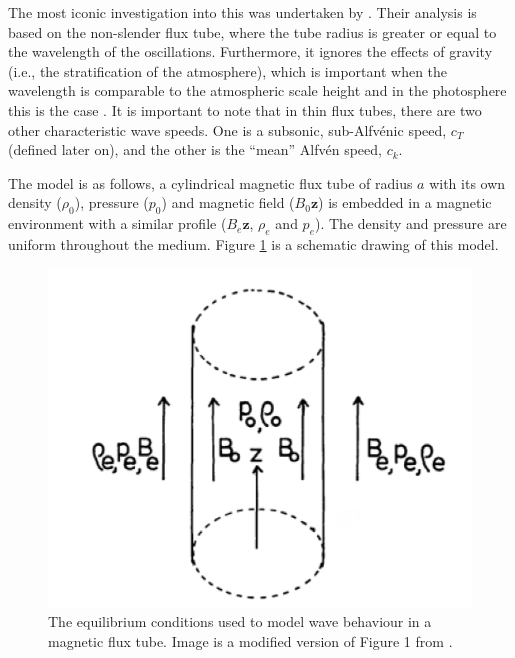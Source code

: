     The most iconic investigation into this was undertaken by \citealt{WPMC}.
    Their analysis is based on the non-slender flux tube, where the tube radius is greater or equal to the wavelength of the oscillations.
    Furthermore, it ignores the effects of gravity (i.e., the stratification of the atmosphere), which is important when the wavelength is comparable to the atmospheric scale height and in the photosphere this is the case \citep{LNLMHD}. 
    It is important to note that in thin flux tubes, there are two other characteristic wave speeds.
    One is a subsonic, sub-Alfv\'{e}nic speed, $c_T$ (defined later on), and the other is the ``mean'' Alfv\'{e}n speed, $c_k$.

    The model is as follows, a cylindrical magnetic flux tube of radius $a$ with its own density ($\rho_0$), pressure ($p_0$) and magnetic field (${B}_0\textbf{\^{z}}$) is embedded in a magnetic environment with a similar profile (${B}_e \textbf{\^{z}}$, $\rho_e$ and $p_e$).   
    The density and pressure are uniform throughout the medium.
    Figure \ref{fig:fluxtube} is a schematic drawing of this model. 
        
    \begin{figure}
        \centering
        \includegraphics[width=\textwidth]{Fluxtube}
        \caption{
                 The equilibrium conditions used to model wave behaviour in a magnetic flux tube.
                 Image is a modified version of Figure 1 from \cite{WPMC}.
                }
        \label{fig:fluxtube}
    \end{figure}
    
